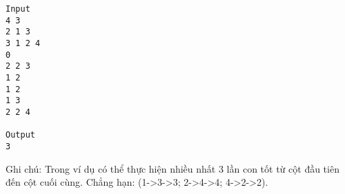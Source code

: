 \begin{verbatim}
Input
4 3 
2 1 3 
3 1 2 4
0
2 2 3 
1 2 
1 2 
1 3 
2 2 4 

Output
3
\end{verbatim}

   Ghi chú: Trong ví dụ có thể thực hiện nhiều nhất 3 lần con tốt từ cột đầu tiên đến cột cuối cùng. Chẳng hạn: (1->3->3; 2->4->4; 4->2->2).